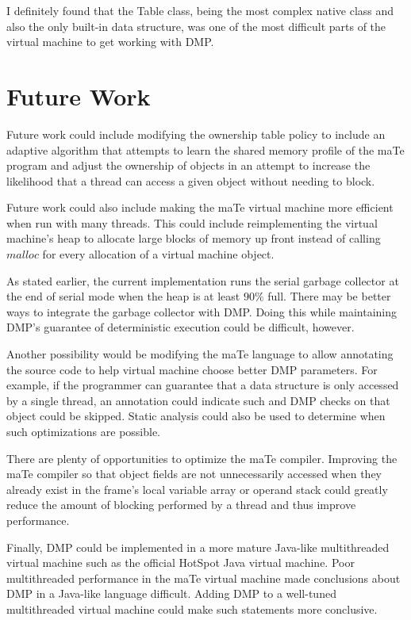 I definitely found that the Table class, being the most complex native
class and also the only built-in data structure, was one of the most
difficult parts of the virtual machine to get working with DMP.

\section{Future Work}

Future work could include modifying the ownership table policy to
include an adaptive algorithm that attempts to learn the shared memory
profile of the maTe program and adjust the ownership of objects in an
attempt to increase the likelihood that a thread can access a given
object without needing to block.

Future work could also include making the maTe virtual machine more
efficient when run with many threads.  This could include
reimplementing the virtual machine's heap to allocate large blocks of
memory up front instead of calling $malloc$ for every allocation of a
virtual machine object.

As stated earlier, the current implementation runs the serial garbage
collector at the end of serial mode when the heap is at least $90\%$
full.  There may be better ways to integrate the garbage collector
with DMP.  Doing this while maintaining DMP's guarantee of
deterministic execution could be difficult, however.

Another possibility would be modifying the maTe language to allow
annotating the source code to help virtual machine choose better DMP
parameters.  For example, if the programmer can guarantee that a data
structure is only accessed by a single thread, an annotation could
indicate such and DMP checks on that object could be skipped.  Static
analysis could also be used to determine when such optimizations are
possible.

There are plenty of opportunities to optimize the maTe compiler.
Improving the maTe compiler so that object fields are not
unnecessarily accessed when they already exist in the frame's local
variable array or operand stack could greatly reduce the amount of
blocking performed by a thread and thus improve performance.

Finally, DMP could be implemented in a more mature Java-like
multithreaded virtual machine such as the official HotSpot Java
virtual machine.  Poor multithreaded performance in the maTe virtual
machine made conclusions about DMP in a Java-like language difficult.
Adding DMP to a well-tuned multithreaded virtual machine could make
such statements more conclusive.

